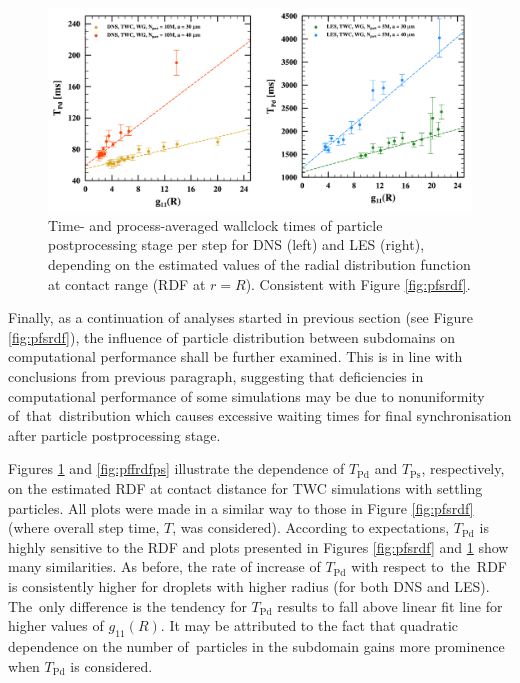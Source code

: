 \documentclass{pracamgren}
\begin{document}
\medskip

\begin{figure}[h]
\centering
\includegraphics[width=13.5cm]{img/plots/3-3h-pffrdfpd.pdf}
\caption{
Time- and process-averaged wallclock times of particle postprocessing stage per step for DNS (left) and LES (right), depending on the estimated values of the radial distribution function at contact range (RDF at $r=R$).
Consistent with Figure \ref{fig:pfsrdf}.
}
\label{fig:pffrdfpd}
\end{figure}

Finally, as a continuation of analyses started in previous section (see Figure \ref{fig:pfsrdf}), the influence of particle distribution between subdomains on computational performance shall be further examined.
This is in line with conclusions from previous paragraph, suggesting that deficiencies in computational performance of some simulations may be due to nonuniformity of~that~distribution which causes excessive waiting times for final synchronisation after particle postprocessing stage.

Figures \ref{fig:pffrdfpd} and \ref{fig:pffrdfps} illustrate the dependence of $T_{\text{Pd}}$ and $T_{\text{Ps}}$, respectively, on the estimated RDF at contact distance for TWC simulations with settling particles.
All plots were made in a similar way to those in Figure \ref{fig:pfsrdf} (where overall step time, $T$, was considered).
According to expectations,  $T_{\text{Pd}}$ is highly sensitive to the RDF and plots presented in Figures \ref{fig:pfsrdf} and \ref{fig:pffrdfpd} show many similarities.
As before, the rate of increase of $T_{\text{Pd}}$ with respect to~the~RDF is consistently higher for droplets with higher radius (for both DNS and LES).  
The~only difference is the tendency for $T_{\text{Pd}}$ results to fall above linear fit line for higher values of $g_{11}(R)$.
It may be attributed to the fact that quadratic dependence on the number of~particles in the subdomain gains more prominence when $T_{\text{Pd}}$ is considered.
\end{document}
